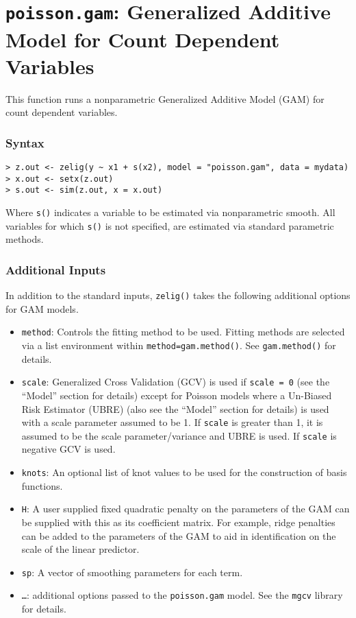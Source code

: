 \section{{\tt poisson.gam}: Generalized Additive Model for Count Dependent Variables}\label{gam.poisson}

This function runs a nonparametric Generalized Additive Model (GAM) for count dependent variables. 

\subsubsection{Syntax}
\begin{verbatim}
> z.out <- zelig(y ~ x1 + s(x2), model = "poisson.gam", data = mydata) 
> x.out <- setx(z.out)
> s.out <- sim(z.out, x = x.out)
\end{verbatim}
Where {\tt s()} indicates a variable to be estimated via nonparametric smooth. All variables for which  {\tt s()} is not specified, are estimated via standard parametric methods. 

\subsubsection{Additional Inputs}
In addition to the standard inputs, {\tt zelig()} takes the following additional options for GAM models.
\begin{itemize}
\item {\tt method}: Controls the fitting method to be used. Fitting methods are selected via a list environment within {\tt method=gam.method()}. See {\tt gam.method()} for details. 
\item {\tt scale}:  Generalized Cross Validation (GCV) is used if {\tt scale = 0} (see the ``Model'' section for details) except for Poisson models where a Un-Biased Risk Estimator (UBRE) (also see the ``Model'' section for details) is used with a scale parameter assumed to be 1. If {\tt scale} is greater than 1, it is assumed to be the scale parameter/variance and UBRE is used. If {\tt scale} is negative GCV is used.
\item {\tt knots}: An optional list of knot values to be used for the construction of basis functions. 
\item {\tt H}: A user supplied fixed quadratic penalty on the parameters of the GAM can be supplied with this as its coefficient matrix. For example, ridge penalties can be added to the parameters of the GAM to aid in identification on the scale of the linear predictor.
\item {\tt sp}: A vector of smoothing parameters for each term.
\item {\tt \ldots}: additional options passed to the {\tt poisson.gam} model. See the {\tt mgcv} library for details. 
\end{itemize}


